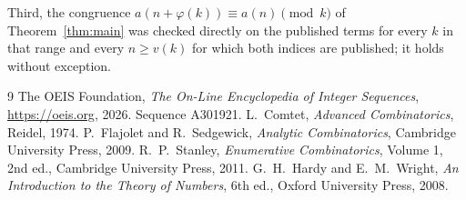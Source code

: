 \documentclass[11pt,a4paper]{article}
\theoremstyle{plain}
\theoremstyle{definition}
\begin{document}
Third, the congruence $a(n+\varphi(k))\equiv a(n)\pmod k$ of Theorem~\ref{thm:main} was
checked directly on the published terms for every $k$ in that range and every $n\ge v(k)$
for which both indices are published; it holds without exception.

\begin{thebibliography}{9}
 The OEIS Foundation, \emph{The On-Line Encyclopedia of Integer
Sequences}, \url{https://oeis.org}, 2026. Sequence A301921.
 L.~Comtet, \emph{Advanced Combinatorics}, Reidel, 1974.
 P.~Flajolet and R.~Sedgewick, \emph{Analytic Combinatorics}, Cambridge
University Press, 2009.
 R.~P.~Stanley, \emph{Enumerative Combinatorics}, Volume 1, 2nd ed.,
Cambridge University Press, 2011.
 G.~H.~Hardy and E.~M.~Wright, \emph{An Introduction to the Theory of
Numbers}, 6th ed., Oxford University Press, 2008.
\end{thebibliography}
\end{document}
